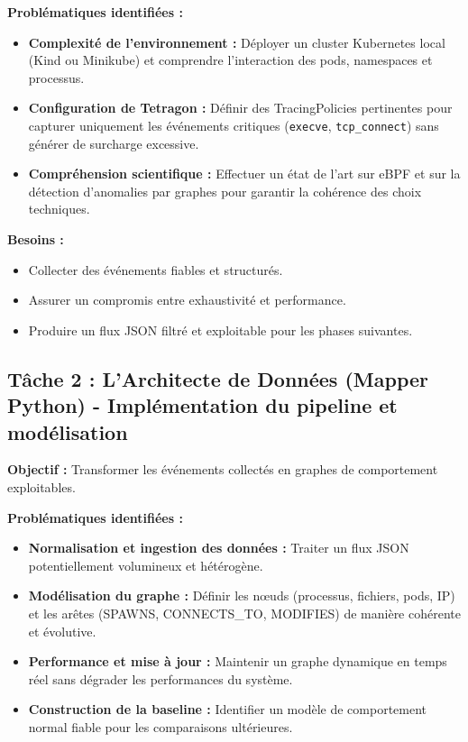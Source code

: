 \documentclass[a4paper,12pt]{article}
\begin{document}
\textbf{Problématiques identifiées :}
\begin{itemize}
    \item \textbf{Complexité de l'environnement :} Déployer un cluster Kubernetes local (Kind ou Minikube) et comprendre l'interaction des pods, namespaces et processus.
    \item \textbf{Configuration de Tetragon :} Définir des TracingPolicies pertinentes pour capturer uniquement les événements critiques (\texttt{execve}, \texttt{tcp\_connect}) sans générer de surcharge excessive.
    \item \textbf{Compréhension scientifique :} Effectuer un état de l’art sur eBPF et sur la détection d’anomalies par graphes pour garantir la cohérence des choix techniques.
\end{itemize}

\textbf{Besoins :} 
\begin{itemize}
    \item Collecter des événements fiables et structurés.
    \item Assurer un compromis entre exhaustivité et performance.
    \item Produire un flux JSON filtré et exploitable pour les phases suivantes.
\end{itemize}

\subsection{Tâche 2 : L'Architecte de Données (Mapper Python) - Implémentation du pipeline et modélisation}

\textbf{Objectif :} Transformer les événements collectés en graphes de comportement exploitables.

\textbf{Problématiques identifiées :}
\begin{itemize}
    \item \textbf{Normalisation et ingestion des données :} Traiter un flux JSON potentiellement volumineux et hétérogène.
    \item \textbf{Modélisation du graphe :} Définir les nœuds (processus, fichiers, pods, IP) et les arêtes (SPAWNS, CONNECTS\_TO, MODIFIES) de manière cohérente et évolutive.
    \item \textbf{Performance et mise à jour :} Maintenir un graphe dynamique en temps réel sans dégrader les performances du système.
    \item \textbf{Construction de la baseline :} Identifier un modèle de comportement normal fiable pour les comparaisons ultérieures.
\end{itemize}
\end{document}
